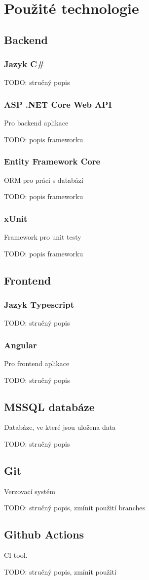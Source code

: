 
\chapter{Použité technologie}

\section{Backend}

\subsection{Jazyk C\#}
TODO: stručný popis

\subsection{ASP .NET Core Web API}
Pro backend aplikace

TODO: popis frameworku

\subsection{Entity Framework Core}
ORM pro práci s databází

TODO: popis frameworku

\subsection{xUnit}
Framework pro unit testy

TODO: popis frameworku

\section{Frontend}

\subsection{Jazyk Typescript}
TODO: stručný popis

\subsection{Angular}
Pro frontend aplikace

TODO: stručný popis

\section{MSSQL databáze}
Databáze, ve které jsou uložena data

TODO: stručný popis

\section{Git}
Verzovací systém

TODO: stručný popis, zmínit použití branches

\section{Github Actions}
CI tool.

TODO: stručný popis, zmínit použití